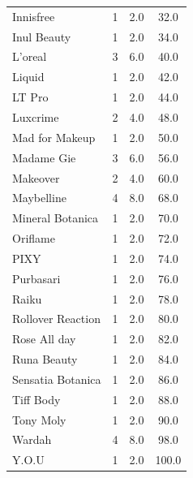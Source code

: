 \documentclass{article}
\begin{document}
\begin{longtable}{|l|c|c|c|}
    Innisfree         & 1                  & 2.0                 & 32.0                           \\
    Inul Beauty       & 1                  & 2.0                 & 34.0                           \\
    L'oreal           & 3                  & 6.0                 & 40.0                           \\
    Liquid            & 1                  & 2.0                 & 42.0                           \\
    LT Pro            & 1                  & 2.0                 & 44.0                           \\
    Luxcrime          & 2                  & 4.0                 & 48.0                           \\
    Mad for Makeup    & 1                  & 2.0                 & 50.0                           \\
    Madame Gie        & 3                  & 6.0                 & 56.0                           \\
    Makeover          & 2                  & 4.0                 & 60.0                           \\
    Maybelline        & 4                  & 8.0                 & 68.0                           \\
    Mineral Botanica  & 1                  & 2.0                 & 70.0                           \\
    Oriflame          & 1                  & 2.0                 & 72.0                           \\
    PIXY              & 1                  & 2.0                 & 74.0                           \\
    Purbasari         & 1                  & 2.0                 & 76.0                           \\
    Raiku             & 1                  & 2.0                 & 78.0                           \\
    Rollover Reaction & 1                  & 2.0                 & 80.0                           \\
    Rose All day      & 1                  & 2.0                 & 82.0                           \\
    Runa Beauty       & 1                  & 2.0                 & 84.0                           \\
    Sensatia Botanica & 1                  & 2.0                 & 86.0                           \\
    Tiff Body         & 1                  & 2.0                 & 88.0                           \\
    Tony Moly         & 1                  & 2.0                 & 90.0                           \\
    Wardah            & 4                  & 8.0                 & 98.0                           \\
    Y.O.U             & 1                  & 2.0                 & 100.0                          \\
\end{longtable}
\newpage
\end{document}
